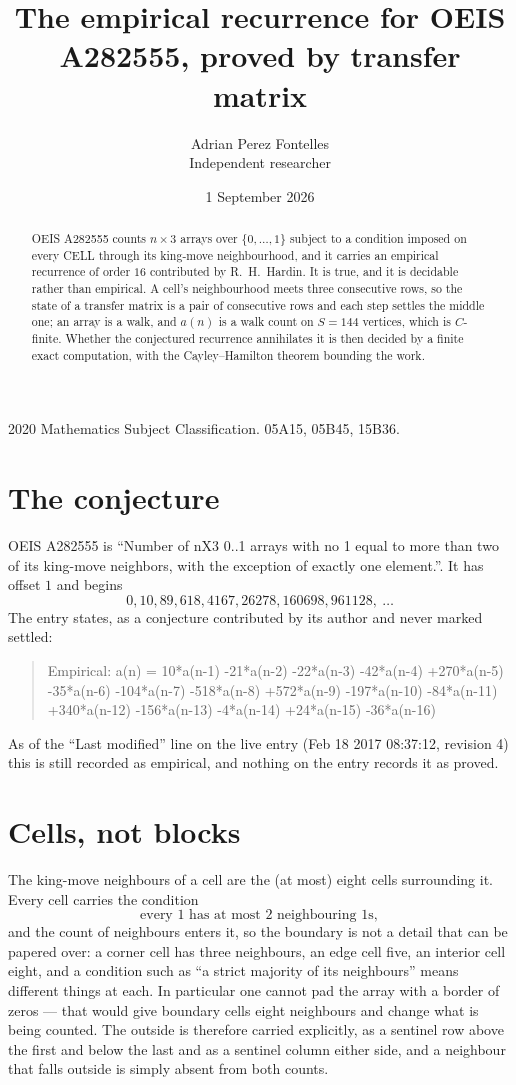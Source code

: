 \documentclass[11pt,a4paper]{article}
\title{The empirical recurrence for OEIS A282555, proved by transfer matrix}
\author{Adrian Perez Fontelles\\ \small Independent researcher}
\date{1 September 2026}
\theoremstyle{plain}
\theoremstyle{definition}
\begin{document}
\maketitle

\begin{abstract}
OEIS A282555 counts $n\times3$ arrays over $\{0,\dots,1\}$ subject to a condition imposed on
every CELL through its king-move neighbourhood, and it carries an empirical recurrence of
order $16$ contributed by R.~H.~Hardin. It is true, and it is decidable rather than
empirical. A cell's neighbourhood meets three consecutive rows, so the state of a transfer
matrix is a pair of consecutive rows and each step settles the middle one; an array is a
walk, and $a(n)$ is a walk count on $S=144$ vertices, which is $C$-finite. Whether the
conjectured recurrence annihilates it is then decided by a finite exact computation, with the
Cayley--Hamilton theorem bounding the work.
\end{abstract}

\noindent\small 2020 Mathematics Subject Classification. 05A15, 05B45, 15B36.\normalsize

\section{The conjecture}

OEIS A282555 is ``Number of nX3 0..1 arrays with no 1 equal to more than two of its king-move neighbors, with the exception of exactly one element.''. It has offset $1$ and begins
\[
0, 10, 89, 618, 4167, 26278, 160698, 961128,\ \dots
\]
The entry states, as a conjecture contributed by its author and never marked settled:
\begin{quote}
Empirical: a(n) = 10*a(n-1) -21*a(n-2) -22*a(n-3) -42*a(n-4) +270*a(n-5) -35*a(n-6) -104*a(n-7) -518*a(n-8) +572*a(n-9) -197*a(n-10) -84*a(n-11) +340*a(n-12) -156*a(n-13) -4*a(n-14) +24*a(n-15) -36*a(n-16)
\end{quote}
As of the ``Last modified'' line on the live entry (Feb 18 2017 08:37:12, revision 4) this is still
recorded as empirical, and nothing on the entry records it as proved.

\section{Cells, not blocks}

The king-move neighbours of a cell are the (at most) eight cells surrounding it. Every cell
carries the condition
\[
\text{every }1\text{ has at most }2\text{ neighbouring }1\text{s},
\]
and the count of neighbours enters it, so the boundary is not a detail that can be papered
over: a corner cell has three neighbours, an edge cell five, an interior cell eight, and a
condition such as ``a strict majority of its neighbours'' means different things at each. In
particular one cannot pad the array with a border of zeros --- that would give boundary cells
eight neighbours and change what is being counted. The outside is therefore carried
explicitly, as a sentinel row above the first and below the last and as a sentinel column
either side, and a neighbour that falls outside is simply absent from both counts.
\end{document}

